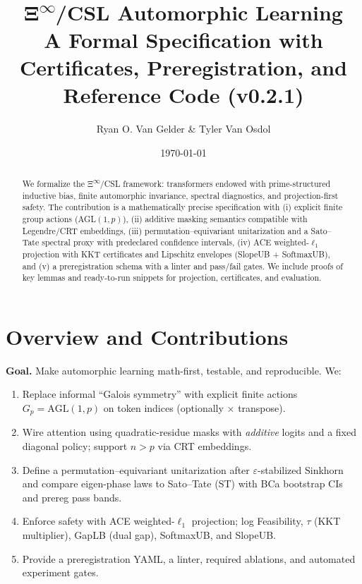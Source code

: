 \documentclass[11pt]{article}
\title{\textbf{Ξ\textsuperscript{$\infty$}/CSL Automorphic Learning}\\
\vspace{0.25em}\large A Formal Specification with Certificates, Preregistration, and Reference Code (v0.2.1)}
\author{Ryan O. Van Gelder \& Tyler Van Osdol}
\date{\today}
\theoremstyle{remark}
\begin{document}
\maketitle

\begin{abstract}
We formalize the Ξ\textsuperscript{$\infty$}/CSL framework: transformers endowed with prime-structured inductive bias, finite automorphic invariance, spectral diagnostics, and projection-first safety. The contribution is a mathematically precise specification with (i) explicit finite group actions (AGL$(1,p)$), (ii) additive masking semantics compatible with Legendre/CRT embeddings, (iii) permutation–equivariant unitarization and a Sato–Tate spectral proxy with predeclared confidence intervals, (iv) ACE weighted-$\ell_1$ projection with KKT certificates and Lipschitz envelopes (SlopeUB + SoftmaxUB), and (v) a preregistration schema with a linter and pass/fail gates. We include proofs of key lemmas and ready-to-run snippets for projection, certificates, and evaluation.
\end{abstract}

\tableofcontents

\section{Overview and Contributions}

\textbf{Goal.} Make automorphic learning math-first, testable, and reproducible. We:
\begin{enumerate}[leftmargin=2em]
  \item Replace informal ``Galois symmetry'' with explicit finite actions $G_p=\mathrm{AGL}(1,p)$ on token indices (optionally $\times$ transpose).
  \item Wire attention using quadratic-residue masks with \emph{additive} logits and a fixed diagonal policy; support $n>p$ via CRT embeddings.
  \item Define a permutation–equivariant unitarization after $\varepsilon$-stabilized Sinkhorn and compare eigen-phase laws to Sato--Tate (ST) with BCa bootstrap CIs and prereg pass bands.
  \item Enforce safety with ACE weighted-$\ell_1$ projection; log Feasibility, $\tau$ (KKT multiplier), GapLB (dual gap), SoftmaxUB, and SlopeUB.
  \item Provide a preregistration YAML, a linter, required ablations, and automated experiment gates.
\end{enumerate}
\end{document}
